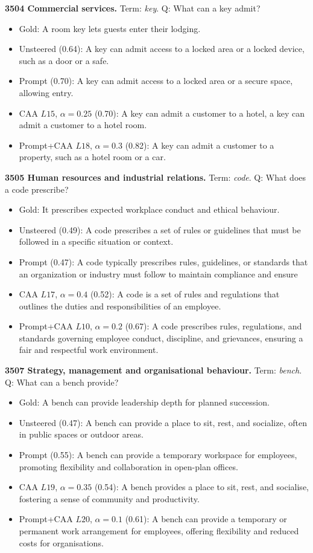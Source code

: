 \medskip\noindent\textbf{3504 Commercial services.} Term: \emph{key}.
Q: What can a key admit?
\begin{itemize}\setlength{\itemsep}{0.15em}\setlength{\parsep}{0pt}\setlength{\topsep}{0.2em}
\item Gold: A room key lets guests enter their lodging.
\item Unsteered (0.64): A key can admit access to a locked area or a locked device, such as a door or a safe.
\item Prompt (0.70): A key can admit access to a locked area or a secure space, allowing entry.
\item CAA $L15$, $\alpha=0.25$ (0.70): A key can admit a customer to a hotel, a key can admit a customer to a hotel room.
\item Prompt+CAA $L18$, $\alpha=0.3$ (0.82): A key can admit a customer to a property, such as a hotel room or a car.
\end{itemize}
\medskip\noindent\textbf{3505 Human resources and industrial relations.} Term: \emph{code}.
Q: What does a code prescribe?
\begin{itemize}\setlength{\itemsep}{0.15em}\setlength{\parsep}{0pt}\setlength{\topsep}{0.2em}
\item Gold: It prescribes expected workplace conduct and ethical behaviour.
\item Unsteered (0.49): A code prescribes a set of rules or guidelines that must be followed in a specific situation or context.
\item Prompt (0.47): A code typically prescribes rules, guidelines, or standards that an organization or industry must follow to maintain compliance and ensure
\item CAA $L17$, $\alpha=0.4$ (0.52): A code is a set of rules and regulations that outlines the duties and responsibilities of an employee.
\item Prompt+CAA $L10$, $\alpha=0.2$ (0.67): A code prescribes rules, regulations, and standards governing employee conduct, discipline, and grievances, ensuring a fair and respectful work environment.
\end{itemize}
\medskip\noindent\textbf{3507 Strategy, management and organisational behaviour.} Term: \emph{bench}.
Q: What can a bench provide?
\begin{itemize}\setlength{\itemsep}{0.15em}\setlength{\parsep}{0pt}\setlength{\topsep}{0.2em}
\item Gold: A bench can provide leadership depth for planned succession.
\item Unsteered (0.47): A bench can provide a place to sit, rest, and socialize, often in public spaces or outdoor areas.
\item Prompt (0.55): A bench can provide a temporary workspace for employees, promoting flexibility and collaboration in open-plan offices.
\item CAA $L19$, $\alpha=0.35$ (0.54): A bench provides a place to sit, rest, and socialise, fostering a sense of community and productivity.
\item Prompt+CAA $L20$, $\alpha=0.1$ (0.61): A bench can provide a temporary or permanent work arrangement for employees, offering flexibility and reduced costs for organisations.
\end{itemize}
